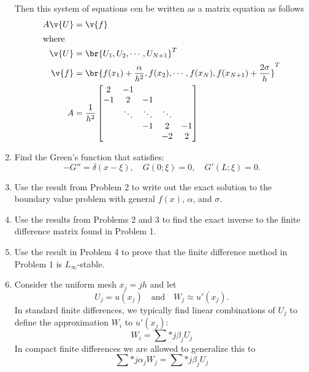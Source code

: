 \documentclass[11pt, oneside]{article}
\begin{document}
\begin{enumerate}
        Then this system of equations cen be written as a matrix equation as follows
        \begin{align*}
            A\v{U} &= \v{f} \\
            \intertext{where}
            \v{U} &= \br{U_1, U_2, \cdots, U_{N+1}}^T \\
            \v{f} &= \br{f(x_1) + \frac{\alpha}{h^2}, f(x_2), \cdots, f(x_N), f(x_{N+1}) + \frac{2\sigma}{h}}^T \\
            A &= \frac{1}{h^2}
            \begin{bmatrix}
                 2 & -1     &        &        &    \\
                -1 &  2     & -1     &        &    \\
                   & \ddots & \ddots & \ddots &    \\
                   &        &     -1 &      2 & -1 \\
                   &        &        &     -2 &  2 \\
            \end{bmatrix}
        \end{align*}

    \item %
        Find the Green's function that satisfies:
        \[
            -G'' = \delta(x - \xi),\quad G(0;\xi) = 0,\quad G'(L;\xi) = 0.
        \]

    \item %
        Use the result from Problem 2 to write out the exact solution to the
        boundary value problem with general $f(x)$, $\alpha$, and $\sigma$.

    \item %
        Use the results from Problems 2 and 3 to find the exact inverse to the
        finite difference matrix found in Problem 1.

    \item %
        Use the result in Problem 4 to prove that the finite difference method
        in Problem 1 is $L_{\infty}$-stable.

    \item %
        Consider the uniform mesh $x_j = jh$ and let
        \[
            U_j = u(x_j) \quad \text{and} \quad W_j \approx u'(x_j).
        \]
        In standard finite differences, we typically find linear combinations
        of $U_j$ to define the approximation $W_i$ to $u'(x_j)$:
        \[
            W_i = \sum*{j}{}{\beta_j U_j}
        \]
        In compact finite differences we are allowed to generalize this to
        \[
            \sum*{j}{}{\alpha_j W_j} = \sum*{j}{}{\beta_j U_j}
        \]


\end{enumerate}
\end{document}
